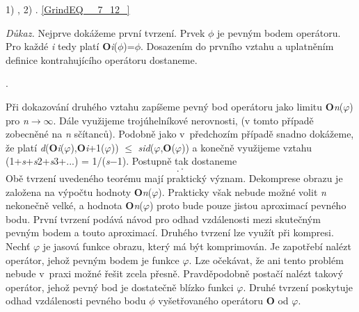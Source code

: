  1)  ,      2)  . \eqref{GrindEQ__7_12_}

\noindent \textit{Důkaz.} Nejprve dokážeme první tvrzení. Prvek $\phi$ je pevným bodem operátoru. Pro každé \textit{i} tedy platí \textbf{O}\textit{i}($\phi$)=$\phi$. Dosazením do prvního vztahu a uplatněním definice kontrahujícího operátoru dostaneme.

 .

\noindent Při dokazování druhého vztahu zapíšeme pevný bod operátoru jako limitu \textbf{O}\textit{n}($\varphi$) pro \textit{n}$\rightarrow$$\infty$. Dále využijeme trojúhelníkové nerovnosti, (v tomto případě zobecněné na \textit{n} sčítanců). Podobně jako v~předchozím případě snadno dokážeme, že platí \textit{d}(\textbf{O}\textit{i}($\varphi$),\textbf{O}\textit{i}+1($\varphi$)) $\leq$ \textit{sid}($\varphi$,\textbf{O}($\varphi$)) a konečně využijeme vztahu (1+\textit{s}+\textit{s}2+\textit{s}3+...) = 1/(\textit{s}$-$1). Postupně tak dostaneme
\[ . \cdot\] 
Obě tvrzení uvedeného teorému mají praktický význam. Dekomprese obrazu je založena na výpočtu hodnoty \textbf{O}\textit{n}($\varphi$). Prakticky však nebude možné volit \textit{n} nekonečně velké, a hodnota \textbf{O}\textit{n}($\varphi$) proto bude pouze jistou aproximací pevného bodu. První tvrzení podává návod pro odhad vzdálenosti mezi skutečným pevným bodem a touto aproximací. Druhého tvrzení lze využít při kompresi. Nechť $\varphi$ je jasová funkce obrazu, který má být komprimován. Je zapotřebí nalézt operátor, jehož pevným bodem je funkce $\varphi$. Lze očekávat, že ani tento problém nebude v~praxi možné řešit zcela přesně. Pravděpodobně postačí nalézt takový operátor, jehož pevný bod je dostatečně blízko funkci $\varphi$. Druhé tvrzení poskytuje odhad vzdálenosti pevného bodu $\phi$ vyšetřovaného operátoru \textbf{O} od $\varphi$.

\noindent 

